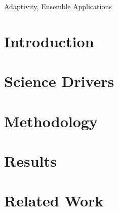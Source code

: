 \documentclass[conference]{IEEEtran}
\begin{document}
\maketitle
\begin{abstract}

\end{abstract}


\begin{IEEEkeywords}
Adaptivity, Ensemble Applications
\end{IEEEkeywords}


\section{Introduction}\label{sec:intro}




\section{Science Drivers}\label{sec:science_motiv}



\section{Methodology}\label{sec:science_motiv}



\section{Results}\label{sec:exps}



\section{Related Work}\label{sec:related_work}

\end{document}
